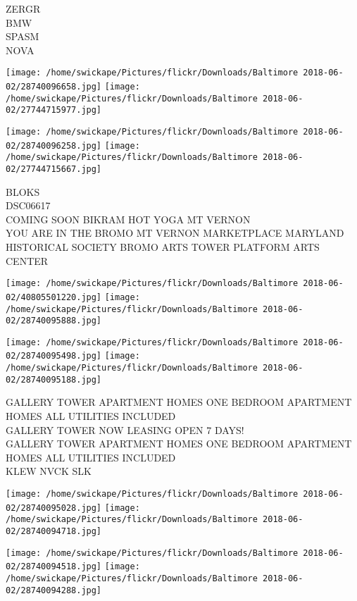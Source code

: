 \documentclass[10pt,letterpaper]{article}
\begin{document}
ZERGR\\
BMW\\
SPASM\\
NOVA\\
\pagebreak

\texttt{[image: /home/swickape/Pictures/flickr/Downloads/Baltimore 2018-06-02/28740096658.jpg]}
\texttt{[image: /home/swickape/Pictures/flickr/Downloads/Baltimore 2018-06-02/27744715977.jpg]}

\texttt{[image: /home/swickape/Pictures/flickr/Downloads/Baltimore 2018-06-02/28740096258.jpg]}
\texttt{[image: /home/swickape/Pictures/flickr/Downloads/Baltimore 2018-06-02/27744715667.jpg]}

BLOKS\\
DSC06617\\
COMING SOON BIKRAM HOT YOGA MT VERNON\\
YOU ARE IN THE BROMO MT VERNON MARKETPLACE MARYLAND HISTORICAL SOCIETY BROMO ARTS TOWER PLATFORM ARTS CENTER\\
\pagebreak

\texttt{[image: /home/swickape/Pictures/flickr/Downloads/Baltimore 2018-06-02/40805501220.jpg]}
\texttt{[image: /home/swickape/Pictures/flickr/Downloads/Baltimore 2018-06-02/28740095888.jpg]}

\texttt{[image: /home/swickape/Pictures/flickr/Downloads/Baltimore 2018-06-02/28740095498.jpg]}
\texttt{[image: /home/swickape/Pictures/flickr/Downloads/Baltimore 2018-06-02/28740095188.jpg]}

GALLERY TOWER APARTMENT HOMES ONE BEDROOM APARTMENT HOMES ALL UTILITIES INCLUDED\\
GALLERY TOWER NOW LEASING OPEN 7 DAYS!\\
GALLERY TOWER APARTMENT HOMES ONE BEDROOM APARTMENT HOMES ALL UTILITIES INCLUDED\\
KLEW NVCK SLK\\
\pagebreak

\texttt{[image: /home/swickape/Pictures/flickr/Downloads/Baltimore 2018-06-02/28740095028.jpg]}
\texttt{[image: /home/swickape/Pictures/flickr/Downloads/Baltimore 2018-06-02/28740094718.jpg]}

\texttt{[image: /home/swickape/Pictures/flickr/Downloads/Baltimore 2018-06-02/28740094518.jpg]}
\texttt{[image: /home/swickape/Pictures/flickr/Downloads/Baltimore 2018-06-02/28740094288.jpg]}
\end{document}
